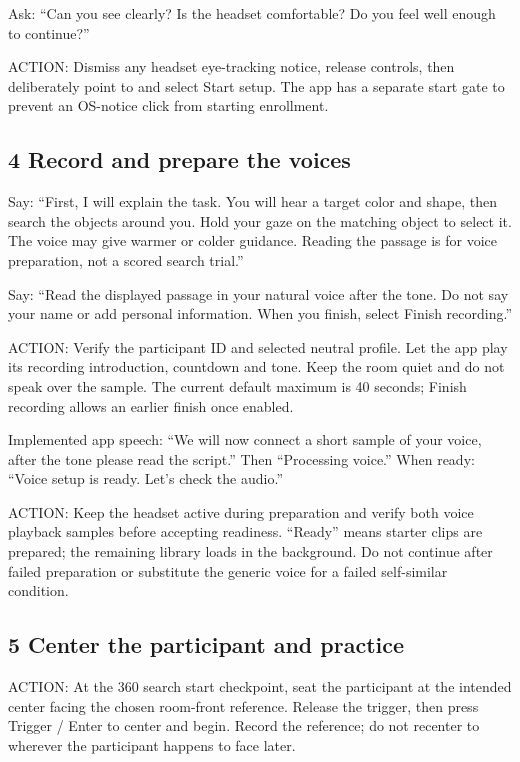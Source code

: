 Ask: ``Can you see clearly? Is the headset comfortable? Do you feel well
enough to continue?''

ACTION: Dismiss any headset eye-tracking notice, release controls, then
deliberately point to and select Start setup. The app has a separate
start gate to prevent an OS-notice click from starting enrollment.

\subsection{4 Record and prepare the
voices}\label{record-and-prepare-the-voices}

Say: ``First, I will explain the task. You will hear a target color and
shape, then search the objects around you. Hold your gaze on the
matching object to select it. The voice may give warmer or colder
guidance. Reading the passage is for voice preparation, not a scored
search trial.''

Say: ``Read the displayed passage in your natural voice after the tone.
Do not say your name or add personal information. When you finish,
select Finish recording.''

ACTION: Verify the participant ID and selected neutral profile. Let the
app play its recording introduction, countdown and tone. Keep the room
quiet and do not speak over the sample. The current default maximum is
40 seconds; Finish recording allows an earlier finish once enabled.

Implemented app speech: ``We will now connect a short sample of your
voice, after the tone please read the script.'' Then ``Processing
voice.'' When ready: ``Voice setup is ready. Let's check the audio.''

ACTION: Keep the headset active during preparation and verify both voice
playback samples before accepting readiness. ``Ready'' means starter
clips are prepared; the remaining library loads in the background. Do
not continue after failed preparation or substitute the generic voice
for a failed self-similar condition.

\subsection{5 Center the participant and
practice}\label{center-the-participant-and-practice}

ACTION: At the 360 search start checkpoint, seat the participant at the
intended center facing the chosen room-front reference. Release the
trigger, then press Trigger / Enter to center and begin. Record the
reference; do not recenter to wherever the participant happens to face
later.

